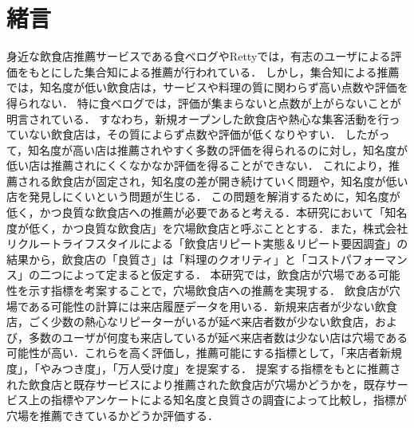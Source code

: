 \chapter{緒言}
\label{chap:intro}
身近な飲食店推薦サービスである食べログ\footnotemark{}やRetty\footnotemark{}では，有志のユーザによる評価をもとにした集合知による推薦が行われている．
しかし，集合知による推薦では，知名度が低い飲食店は，サービスや料理の質に関わらず高い点数や評価を得られない．
特に食べログでは，評価が集まらないと点数が上がらないことが明言されている\cite{score}．
すなわち，新規オープンした飲食店や熱心な集客活動を行っていない飲食店は，その質によらず点数や評価が低くなりやすい．
したがって，知名度が高い店は推薦されやすく多数の評価を得られるのに対し，知名度が低い店は推薦されにくくなかなか評価を得ることができない．
これにより，推薦される飲食店が固定され，知名度の差が開き続けていく問題や，知名度が低い店を発見しにくいという問題が生じる．
この問題を解消するために，知名度が低く，かつ良質な飲食店への推薦が必要であると考える．本研究において「知名度が低く，かつ良質な飲食店」を穴場飲食店と呼ぶこととする．また，株式会社リクルートライフスタイルによる「飲食店リピート実態＆リピート要因調査」\cite{repeat}の結果から，飲食店の「良質さ」は「料理のクオリティ」と「コストパフォーマンス」の二つによって定まると仮定する．
本研究では，飲食店が穴場である可能性を示す指標を考案することで，穴場飲食店への推薦を実現する．
飲食店が穴場である可能性の計算には来店履歴データを用いる．新規来店者が少ない飲食店，ごく少数の熱心なリピーターがいるが延べ来店者数が少ない飲食店，および，多数のユーザが何度も来店しているが延べ来店者数は少ない店は穴場である可能性が高い．これらを高く評価し，推薦可能にする指標として，「来店者新規度」，「やみつき度」，「万人受け度」を提案する．
提案する指標をもとに推薦された飲食店と既存サービスにより推薦された飲食店が穴場かどうかを，既存サービス上の指標やアンケートによる知名度と良質さの調査によって比較し，指標が穴場を推薦できているかどうか評価する．
